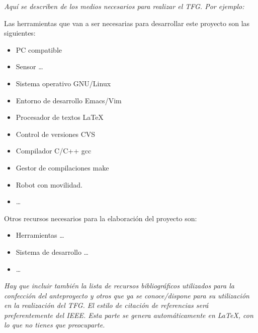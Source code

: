 \documentclass[11pt,a4paper,oneside]{article}
\begin{document}
\textit{Aquí se describen de los medios necesarios para realizar el TFG. Por
  ejemplo:}

Las herramientas que van a ser necesarias para desarrollar este proyecto
son las siguientes:

\begin{itemize}
\item PC compatible
\item Sensor  \ldots
\item Sistema operativo GNU/Linux~\cite{gnulinux}
\item Entorno de desarrollo Emacs/Vim~\cite{emacs}
\item Procesador de textos \LaTeX~\cite{lamport94}
\item Control de versiones CVS~\cite{cvs}
\item Compilador C/C++ gcc~\cite{gcc}
\item Gestor de compilaciones make~\cite{make}
\item Robot con movilidad.
\item  \ldots
\end{itemize}



Otros recursos necesarios para la elaboración del proyecto son:

\begin{itemize}
\item Herramientas  \ldots
\item Sistema de desarrollo  \ldots
\item  \ldots
\end{itemize}


\textit{Hay que incluir también la lista de recursos bibliográficos utilizados para la confección del anteproyecto y otros que ya se conoce/dispone para su utilización en la realización del TFG. El estilo de citación de referencias será preferentemente del IEEE. Esta parte se genera automáticamente en \LaTeX{}, con lo que no tienes que preocuparte. }

% 


\end{document}
